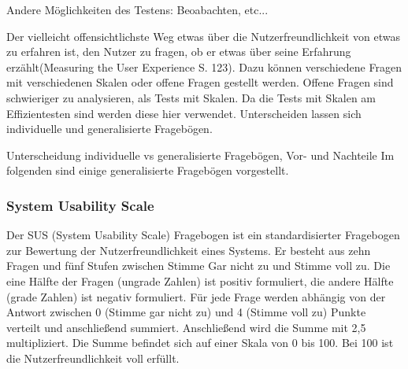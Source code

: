 Andere Möglichkeiten des Testens: Beoabachten, etc...

\glqq Der vielleicht offensichtlichste Weg etwas über die Nutzerfreundlichkeit von etwas zu erfahren ist, den Nutzer zu fragen, ob er etwas über seine Erfahrung erzählt\grqq(Measuring the User Experience S. 123). Dazu können verschiedene Fragen mit verschiedenen Skalen oder offene Fragen gestellt werden. Offene Fragen sind schwieriger zu analysieren, als Tests mit Skalen. Da die Tests mit Skalen am Effizientesten sind werden diese hier verwendet. Unterscheiden lassen sich individuelle und generalisierte Fragebögen.

Unterscheidung individuelle vs generalisierte Fragebögen, Vor- und Nachteile
Im folgenden sind einige generalisierte Fragebögen vorgestellt.

\subsubsection*{System Usability Scale}
Der SUS (System Usability Scale) Fragebogen ist ein standardisierter Fragebogen zur Bewertung der Nutzerfreundlichkeit eines Systems. Er besteht aus zehn Fragen und fünf Stufen zwischen Stimme Gar nicht zu und Stimme voll zu. Die eine Hälfte der Fragen (ungrade Zahlen) ist positiv formuliert, die andere Hälfte (grade Zahlen) ist negativ formuliert. Für jede Frage werden abhängig von der Antwort zwischen 0 (Stimme gar nicht zu) und 4 (Stimme voll zu) Punkte verteilt und anschließend summiert. Anschließend wird die Summe mit 2,5 multipliziert. Die Summe befindet sich auf einer Skala von 0 bis 100. Bei 100 ist die Nutzerfreundlichkeit voll erfüllt. 

